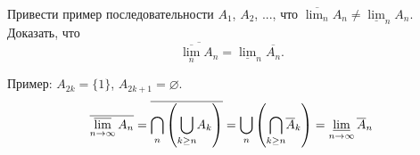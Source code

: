 \begin{task}{3}
Привести пример последовательности $A_1$, $A_2$, ..., что $\overline{\lim_n}A_n  \neq \underline{\lim}_n A_n.$ Доказать, что
\begin{equation*}
    \overline{\overline{\lim_n}A_n}  = \underline{\lim}_n \overline{A_n}.
\end{equation*}
\end{task}
\begin{solution}
Пример: $A_{2k} = \{1\}$, $A_{2k + 1} = \varnothing$.
\begin{equation*}
    \overline{\varlimsup_{n \to \infty} A_n} = \overline{ \underset{n}{\bigcap} \left( \underset{k \geq n}{\bigcup} A_k \right)} = \underset{n}{\bigcup} \left( \underset{k \geq n}{\bigcap} \overline{A}_k \right) = \varliminf_{n \to \infty} \overline{A}_n
\end{equation*}
\end{solution}
